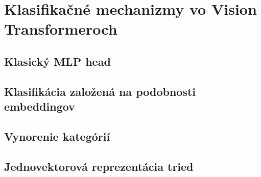 \chapter{Klasifikačné mechanizmy vo Vision Transformeroch}

\label{kap:klasifikacne_mechanizmy}

\section{Klasický MLP head}

\section{Klasifikácia založená na podobnosti embeddingov}

\section{Vynorenie kategórií}

\section{Jednovektorová reprezentácia tried}